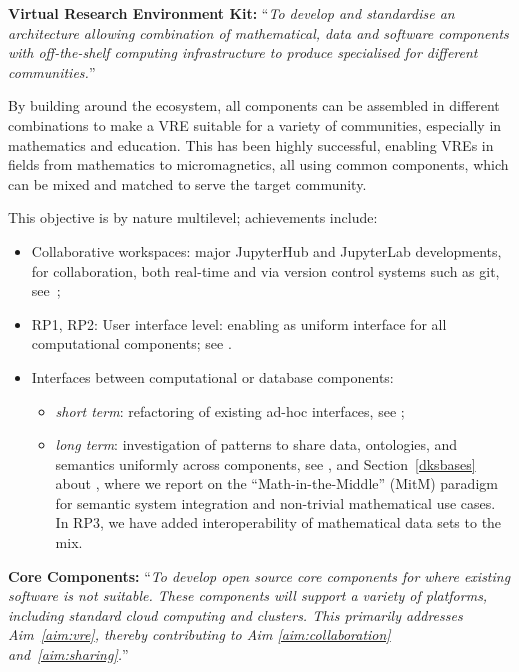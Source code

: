 \begin{compactenum}[\bf {Obj} 1\rm]
\item\label{objective:framework} \textbf{Virtual Research Environment Kit:} ``\emph{To develop and standardise an architecture
    allowing combination of mathematical, data and software components with off-the-shelf
    computing infrastructure to produce specialised \VREs for different communities.}''

  By building around the \Jupyter ecosystem,
  all \ODK components can be assembled in different combinations
  to make a VRE suitable for a variety of communities,
  especially in mathematics and education.
  This has been highly successful,
  enabling VREs in fields from mathematics
  to micromagnetics,
  all using common \ODK components,
  which can be mixed and matched to serve
  the target community.

  This objective is by nature multilevel; achievements include:
  \begin{itemize}
  \item Collaborative workspaces: major JupyterHub and JupyterLab developments,
  for collaboration,
  both real-time and via version control systems such as git,
    see~;
  \item RP1, RP2: User interface level: enabling \Jupyter as uniform interface for all computational
    components; see .
  \item Interfaces between computational or database components:
    \begin{itemize}
    \item \emph{short term}: refactoring of existing ad-hoc interfaces, see ;
    \item \emph{long term}: investigation of patterns to share data, ontologies, and semantics uniformly across components, see , and Section~\ref{dksbases} about , where we report on the ``Math-in-the-Middle'' (MitM) paradigm for semantic system integration and non-trivial mathematical use cases. In RP3, we have added interoperability of mathematical data sets to the mix.
  \end{itemize}
\end{itemize}

\item\label{objectives:core} \textbf{Core Components:}
  ``\emph{To develop open source core components
  for \VREs where existing software is not suitable. These components
  will support a variety of platforms, including standard cloud
  computing and clusters. This primarily addresses Aim~\ref{aim:vre},
  thereby contributing to Aim \ref{aim:collaboration}
  and~\ref{aim:sharing}.}''


\end{compactenum}
